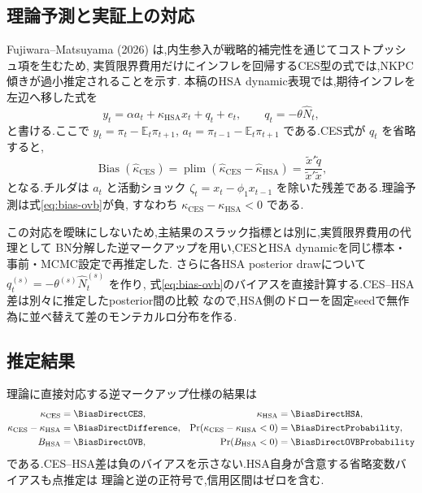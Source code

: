 \documentclass[11pt]{article}
\begin{document}
\subsection{理論予測と実証上の対応}
Fujiwara--Matsuyama (2026) は,内生参入が戦略的補完性を通じてコストプッシュ項を生むため,
実質限界費用だけにインフレを回帰するCES型の式では,NKPC傾きが過小推定されることを示す.
本稿のHSA dynamic表現では,期待インフレを左辺へ移した式を
\begin{equation}
y_t=\alpha a_t+\kappa_{\mathrm{HSA}}x_t+q_t+e_t,
\qquad q_t=-\theta\hat N_t,
\label{eq:bias-hsa}
\end{equation}
と書ける.ここで $y_t=\pi_t-\mathbb E_t\pi_{t+1}$,
$a_t=\pi_{t-1}-\mathbb E_t\pi_{t+1}$ である.CES式が $q_t$ を省略すると,
\begin{equation}
\operatorname{Bias}(\hat\kappa_{\mathrm{CES}})
=\operatorname{plim}(\hat\kappa_{\mathrm{CES}}-\hat\kappa_{\mathrm{HSA}})
=\frac{\tilde x'\tilde q}{\tilde x'\tilde x},
\label{eq:bias-ovb}
\end{equation}
となる.チルダは $a_t$ と活動ショック
$\zeta_t=x_t-\phi_1x_{t-1}$ を除いた残差である.理論予測は式\eqref{eq:bias-ovb}が負,
すなわち $\kappa_{\mathrm{CES}}-\kappa_{\mathrm{HSA}}<0$ である.

この対応を曖昧にしないため,主結果のスラック指標とは別に,実質限界費用の代理として
BN分解した逆マークアップを用い,CESとHSA dynamicを同じ標本・事前・MCMC設定で再推定した.
さらに各HSA posterior drawについて $q_t^{(s)}=-\theta^{(s)}\hat N_t^{(s)}$ を作り,
式\eqref{eq:bias-ovb}のバイアスを直接計算する.CES--HSA差は別々に推定したposterior間の比較
なので,HSA側のドローを固定seedで無作為に並べ替えて差のモンテカルロ分布を作る.

\subsection{推定結果}
理論に直接対応する逆マークアップ仕様の結果は
\begin{align*}
\kappa_{\mathrm{CES}}&=\BiasDirectCES,&
\kappa_{\mathrm{HSA}}&=\BiasDirectHSA,\\
\kappa_{\mathrm{CES}}-\kappa_{\mathrm{HSA}}&=\BiasDirectDifference,&
\Pr(\kappa_{\mathrm{CES}}-\kappa_{\mathrm{HSA}}<0)&=\BiasDirectProbability,\\
B_{\mathrm{HSA}}&=\BiasDirectOVB,&
\Pr(B_{\mathrm{HSA}}<0)&=\BiasDirectOVBProbability
\end{align*}
である.CES--HSA差は負のバイアスを示さない.HSA自身が含意する省略変数バイアスも点推定は
理論と逆の正符号で,信用区間はゼロを含む.
\end{document}
